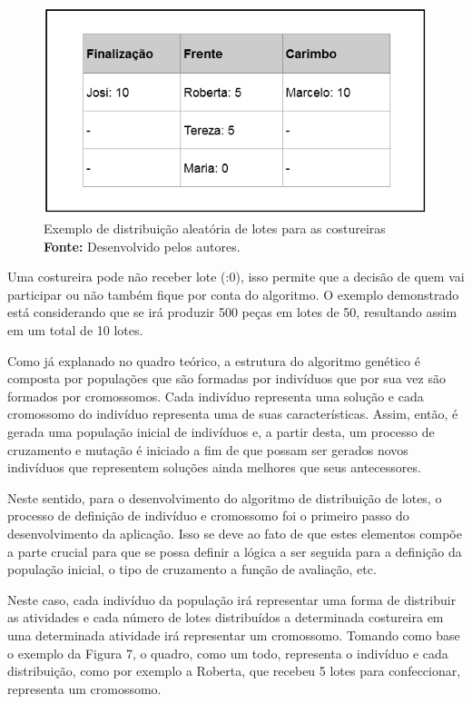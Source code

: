 \begin{figure}[h!]
	\centerline{\includegraphics[scale=0.6]{./imagens/distribuicao_exemplo.png}}
	\caption[Exemplo de distribuição aleatória de lotes para as costureiras]
	{Exemplo de distribuição aleatória de lotes para as costureiras \textbf{Fonte:}
	Desenvolvido pelos autores.}
	\label{fig:exemplo1}
\end{figure}

\par Uma costureira pode não receber lote (:0), isso permite que a decisão de
quem vai participar ou não também fique por conta do algoritmo. O exemplo demonstrado está considerando que se irá produzir 500 peças em lotes de 50, 
resultando assim em um total de 10 lotes.

\par Como já explanado no quadro teórico, a estrutura do algoritmo genético é composta
por populações que são formadas por indivíduos que por sua vez são formados por cromossomos.
Cada indivíduo representa uma solução e cada cromossomo do indivíduo representa uma de suas características. 
Assim, então, é gerada uma população inicial de indivíduos e, a partir desta, um
processo de cruzamento e mutação é iniciado a fim de que possam ser gerados
novos indivíduos que representem soluções ainda melhores que seus antecessores.

\par Neste sentido, para o desenvolvimento do algoritmo de distribuição de
lotes, o processo de definição de indivíduo e cromossomo foi o primeiro passo do desenvolvimento da aplicação. Isso se
deve ao fato de que estes elementos compõe a parte crucial para que se
possa definir a lógica a ser seguida para a definição da população inicial, o
tipo de cruzamento a função de avaliação, etc.

\par Neste caso, cada indivíduo da população irá representar uma forma de
distribuir as atividades e cada número de lotes distribuídos a determinada
costureira em uma determinada atividade irá representar um cromossomo. 
Tomando como base o exemplo da Figura 7, o quadro, como um todo, representa 
o indivíduo e cada distribuição, como por exemplo a Roberta, que recebeu 5 
lotes para confeccionar, representa um cromossomo.

